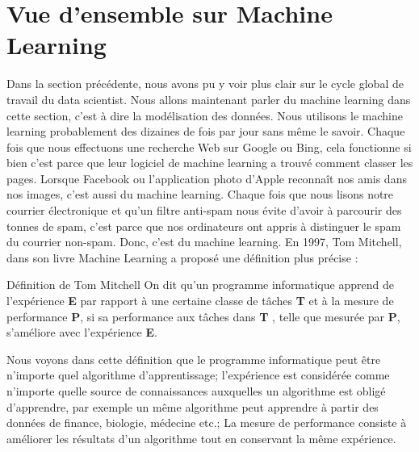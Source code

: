 \documentclass[12pt, french]{report}
\begin{document}
\section{Vue d'ensemble sur Machine Learning}

Dans la section précédente, nous avons pu y voir plus clair sur le cycle global de travail du data scientist. Nous allons maintenant parler du machine learning dans cette section, c'est à dire la modélisation des données. Nous utilisons le machine learning probablement des dizaines de fois par jour sans même le savoir. Chaque fois que nous effectuons une recherche Web sur Google ou Bing, cela fonctionne si bien c'est parce que leur logiciel de machine learning a trouvé comment classer les pages. Lorsque Facebook ou l'application photo d'Apple reconnaît nos amis dans nos images, c'est aussi du machine learning. Chaque fois que nous lisons notre courrier électronique et qu'un filtre anti-spam nous évite d'avoir à parcourir des tonnes de spam, c'est parce que nos ordinateurs ont appris à distinguer le spam du courrier non-spam. Donc, c'est du machine learning. En 1997, Tom Mitchell, dans son livre \guillemotleft Machine Learning \guillemotright \cite{key37} a proposé une définition plus précise : 

\begin{pquotation} {Définition de Tom Mitchell}
	\guillemotleft On dit qu'un programme informatique apprend de l'expérience \textbf{E} par rapport à une certaine classe de tâches \textbf{T} et à la mesure de performance \textbf{P}, si sa performance aux tâches dans \textbf{T} , telle que mesurée par \textbf{P}, s'améliore avec l'expérience \textbf{E}\guillemotright.
\end{pquotation}

Nous voyons dans cette définition que le programme informatique peut être n'importe quel algorithme d'apprentissage; l'expérience est considérée comme n'importe quelle source de connaissances auxquelles un algorithme est obligé d'apprendre, par exemple un même algorithme peut apprendre à partir des données de finance, biologie, médecine etc.; La mesure de performance consiste à améliorer les résultats d'un algorithme tout en conservant la même expérience. \\ 
\end{document}
